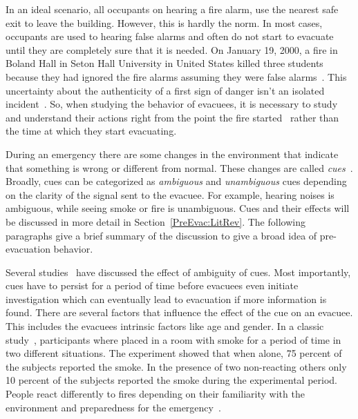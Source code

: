 In an ideal scenario, all occupants on hearing a fire alarm, use the nearest safe exit to leave the building. However, this is hardly the norm. In most cases, occupants are used to hearing false alarms and often do not start to evacuate until they are completely sure that it is needed. On January 19, 2000, a fire in Boland Hall in Seton Hall University in United States killed three students because they had ignored the fire alarms assuming they were false alarms~\cite{Berry:2000us}. This uncertainty about the authenticity of a first sign of danger isn't an isolated incident~\cite{Graham:2000vl,Proulx:2001we,Proulx:1995wq,Proulx:2003tc,Purser:2001ts,Ramachandran:1990wj,Sime:1995uu,Tong:1985wn}. So, when studying the behavior of evacuees, it is necessary to study and understand their actions right from the point the fire started~\cite{Tong:1985wn} rather than the time at which they start evacuating.


During an emergency there are some changes in the environment that indicate that something is wrong or different from normal. These changes are called \emph{cues}~\cite{Sime:1983uy}. Broadly, cues can be categorized as \emph{ambiguous} and \emph{unambiguous} cues depending on the clarity of the signal sent to the evacuee. For example, hearing noises is ambiguous, while seeing smoke or fire is unambiguous. Cues and their effects will be discussed in more detail in Section~\ref{PreEvac:LitRev}. The following paragraphs give a brief summary of the discussion to give a broad idea of pre-evacuation behavior.

Several studies~\cite{Ramachandran:1990wj,Proulx:2007ul,Tong:1985wn} have discussed the effect of ambiguity of cues. Most importantly, cues have to persist for a period of time before evacuees even initiate investigation which can eventually lead to evacuation if more information is found. There are several factors that influence the effect of the cue on an evacuee. This includes the evacuees intrinsic factors like age and gender. In a classic study~\cite{Latane:1969wm}, participants where placed in a room with smoke for a period of time in two different situations. The experiment showed that when alone, 75 percent of the subjects reported the smoke. In the presence of two non-reacting others only 10 percent of the subjects reported the smoke during the experimental period. People react differently to fires depending on their familiarity with the environment and preparedness for the emergency~\cite{Proulx:2003tc,Proulx:2001we,Paulsen:1984ti,Sandberg:1997tw,Cocking:2008vv,Tong:1985wn}.

